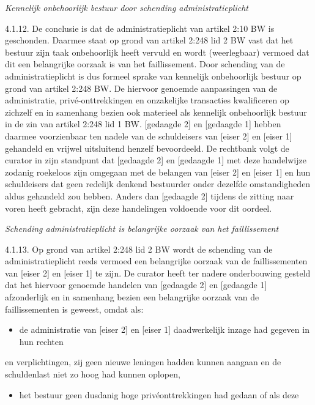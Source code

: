\documentclass[
  dutch,
  a4paper,
]{article}
\providecommand{\tightlist}{%
  \setlength{\itemsep}{0pt}\setlength{\parskip}{0pt}}
\begin{document}
\emph{Kennelijk onbehoorlijk bestuur door schending administratieplicht}

4.1.12. De conclusie is dat de administratieplicht van artikel 2:10 BW is geschonden. Daarmee staat op grond van artikel 2:248 lid 2 BW vast dat het bestuur zijn taak onbehoorlijk heeft vervuld en wordt (weerlegbaar) vermoed dat dit een belangrijke oorzaak is van het faillissement. Door schending van de administratieplicht is dus formeel sprake van kennelijk onbehoorlijk bestuur op grond van artikel 2:248 BW. De hiervoor genoemde aanpassingen van de administratie, privé-onttrekkingen en onzakelijke transacties kwalificeren op zichzelf en in samenhang bezien ook materieel als kennelijk onbehoorlijk bestuur in de zin van artikel 2:248 lid 1 BW. {[}gedaagde 2{]} en {[}gedaagde 1{]} hebben daarmee voorzienbaar ten nadele van de schuldeisers van {[}eiser 2{]} en {[}eiser 1{]} gehandeld en vrijwel uitsluitend henzelf bevoordeeld. De rechtbank volgt de curator in zijn standpunt dat {[}gedaagde 2{]} en {[}gedaagde 1{]} met deze handelwijze zodanig roekeloos zijn omgegaan met de belangen van {[}eiser 2{]} en {[}eiser 1{]} en hun schuldeisers dat geen redelijk denkend bestuurder onder dezelfde omstandigheden aldus gehandeld zou hebben. Anders dan {[}gedaagde 2{]} tijdens de zitting naar voren heeft gebracht, zijn deze handelingen voldoende voor dit oordeel.

\emph{Schending administratieplicht is belangrijke oorzaak van het faillissement}

4.1.13. Op grond van artikel 2:248 lid 2 BW wordt de schending van de administratieplicht reeds vermoed een belangrijke oorzaak van de faillissementen van {[}eiser 2{]} en {[}eiser 1{]} te zijn. De curator heeft ter nadere onderbouwing gesteld dat het hiervoor genoemde handelen van {[}gedaagde 2{]} en {[}gedaagde 1{]} afzonderlijk en in samenhang bezien een belangrijke oorzaak van de faillissementen is geweest, omdat als:

\begin{itemize}
\tightlist
\item
  de administratie van {[}eiser 2{]} en {[}eiser 1{]} daadwerkelijk inzage had gegeven in hun rechten
\end{itemize}

en verplichtingen, zij geen nieuwe leningen hadden kunnen aangaan en de schuldenlast niet zo hoog had kunnen oplopen,

\begin{itemize}
\tightlist
\item
  het bestuur geen dusdanig hoge privéonttrekkingen had gedaan of als deze
\end{itemize}
\end{document}
